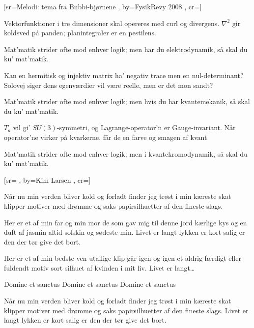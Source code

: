 \documentclass[pdftex,12pt]{article}
\begin{document}
\begin{songs}{}
﻿[sr={Melodi: tema fra Bubbi-bjørnene}
,
by={FysikRevy 2008}
,
cr={}]\hypertarget{Mat'matik}{}
\label{song18}

\beginverse
Vektorfunktioner i tre dimensioner
skal opereres med curl og divergens.
$\nabla^2$ gir koldsved på panden;
planintegraler er en pestilens.
\endverse

\beginverse
Mat'matik
strider ofte mod enhver logik;
men har du elektrodynamik,
så skal du ku' mat'matik.
\endverse

\beginverse
Kan en hermitisk og injektiv matrix
ha' negativ trace men en nul-determinant?
Solovej siger dens egenværdier
vil være reelle, men er det mon sandt?
\endverse

\beginverse
Mat'matik
strider ofte mod enhver logik;
men hvis du har kvantemekanik,
så skal du ku' mat'matik.
\endverse

\beginverse
$T_a$ vil gi' $SU(3)$-symmetri,
og Lagrange-operator'n er Gauge-invariant.
Når operator'ne virker på kvarkerne,
får de en farve og smagen af kvant
\endverse

\beginverse
Mat'matik
strider ofte mod enhver logik;
men i kvantekromodynamik,
så skal du ku' mat'matik.
\endverse
\endsong



﻿[sr={}
,
by={Kim Larsen}
,
cr={}]\hypertarget{Papirsklip}{}
\label{song19}

\beginverse
Når nu min verden bliver kold og forladt
finder jeg trøst i min kæreste skat
klipper motiver med drømme og saks
papirsilhuetter af den fineste slags.
\endverse

\beginverse
Her er et af min far og min mor
de som gav mig til denne jord
kærlige kys og en duft af jasmin
altid solskin og sødeste min.
Livet er langt
lykken er kort
salig er den der tør give det bort.
\endverse

\beginverse
Her er et af min bedste ven
utallige klip går igen og igen
et aldrig færdigt eller fuldendt motiv
sort silhuet af kvinden i mit liv.
Livet er langt\ldots
\endverse

\beginverse
Domine et sanctus
Domine et sanctus
Domine et sanctus
\endverse

\beginverse
Når nu min verden bliver kold og forladt
finder jeg trøst i min kæreste skat
klipper motiver med drømme og saks
papirsilhuetter af den fineste slags.
\lrep Livet er langt
lykken er kort
salig er den der tør give det bort.\rrep
\endverse
\endsong




\end{songs}
\end{document}

